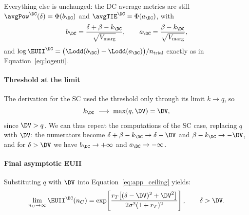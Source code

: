 Everything else is unchanged: the DC average metrics are still $\avgPow^{\DC}(\delta) = \Phi(b_{\DC})$ and $\avgTIE^{\DC} = \Phi(a_{\DC})$, with
\[
  b_{\DC} = \frac{\delta+\beta-k_{\DC}}{\sqrt{V_{\text{marg}}}},
  \qquad
  a_{\DC} = \frac{\beta-k_{\DC}}{\sqrt{V_{\text{marg}}}},
\]
and $\log\EUII^{\DC} = \big(\Lodd(b_{\DC})-\Lodd(a_{\DC})\big)/n_{\text{trial}}$ exactly as in Equation~\eqref{eq:logeuii}.

\paragraph{Threshold at the limit}
The derivation for the SC used the threshold only through its limit $k\to q$, so
\[
  k_{\DC} \;\longrightarrow\; \max(q,\DV) = \DV,
\]
since $\DV > q$. We can thus repeat the computations of the SC case, replacing $q$ with $\DV$: the numerators become $\delta+\beta-k_{\DC}\to\delta-\DV$ and $\beta-k_{\DC}\to-\DV$, and for $\delta>\DV$ we have $b_{\DC}\to+\infty$ and $a_{\DC}\to-\infty$.


\paragraph{Final asymptotic EUII}
Substituting $q$ with $\DV$ into Equation~\eqref{eq:app_ceiling} yields:
\begin{equation}\label{eq:app_ceiling_dc}
  \lim_{n_C\to\infty}\EUII^{\DC}(n_C)
  = \exp\!\left[\frac{r_T\big[(\delta-\DV)^2+\DV^2\big]}{2\sigma^2(1+r_T)^2}\right],
  \qquad \delta > \DV .
\end{equation}


